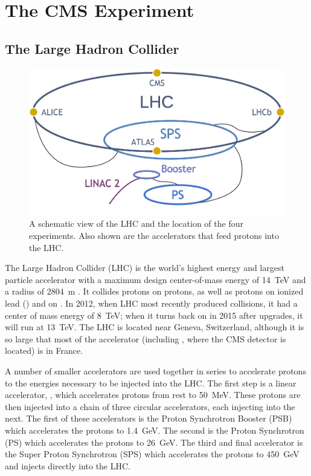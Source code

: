 \chapter{The CMS Experiment}
\label{chapter:experiment}

\section{The Large Hadron Collider}
\label{sec:lhc}

\begin{figure}[!htbp]
    \centering
    \includegraphics[width=\textwidth]{figures/alex_lhc_layout.pdf}
    \caption[
        A schematic view of the LHC and the location of the four experiments.
    ]{
        A schematic view of the LHC and the location of the four experiments.
        Also shown are the accelerators that feed protons into the LHC.
    }
    \label{fig:lhc_layout}
\end{figure}

The Large Hadron Collider (LHC) is the world's highest energy and largest
particle accelerator with a maximum design center-of-mass energy of
\SI{14}{\TeV} and a radius of \SI{2804}{\meter} \cite{bruning2004}. It collides
protons on protons, as well as protons on ionized lead (\lead) and \lead on
\lead. In 2012, when LHC most recently produced collisions, it had a center of
mass energy of \SI{8}{\TeV}; when it turns back on in 2015 after upgrades, it
will run at \SI{13}{\TeV}. The LHC is located near Geneva, Switzerland,
although it is so large that most of the accelerator (including \pointfive,
where the CMS detector is located) is in France.

A number of smaller accelerators are used together in series to accelerate
protons to the energies necessary to be injected into the LHC. The first step
is a linear accelerator, \linactwo, which accelerates protons from rest to
\SI{50}{\MeV}. These protons are then injected into a chain of three circular
accelerators, each injecting into the next. The first of these accelerators is
the Proton Synchrotron Booster (PSB) which accelerates the protons to
\SI{1.4}{\GeV}. The second is the Proton Synchrotron (PS) which accelerates the
protons to \SI{26}{\GeV}. The third and final accelerator is the Super Proton
Synchrotron (SPS) which accelerates the protons to \SI{450}{\GeV} and injects
directly into the LHC.

